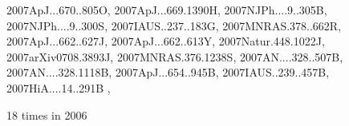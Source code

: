 \documentclass[12pt]{article}
\begin{document}
\begin{description}
{2007ApJ...670..805O,%
2007ApJ...669.1390H,%
2007NJPh....9..305B,%
2007NJPh....9..300S,%
2007IAUS..237..183G,%
2007MNRAS.378..662R,%
2007ApJ...662..627J,%
2007ApJ...662..613Y,%
2007Natur.448.1022J,%
2007arXiv0708.3893J,%
2007MNRAS.376.1238S,%
2007AN....328..507B,%
2007AN....328.1118B,%
2007ApJ...654..945B,%
2007IAUS..239..457B,%
2007HiA....14..291B%
},\item
18 times in 2006 \citep{
2006ApJ...653..558O,%
2006A&A...459..935H,%
2006A&A...457..371F,%
2006MNRAS.370..529D,%
2006PhFl...18g5106H,%
2006ApJ...643.1219J,%
}
\end{description}
\end{document}
